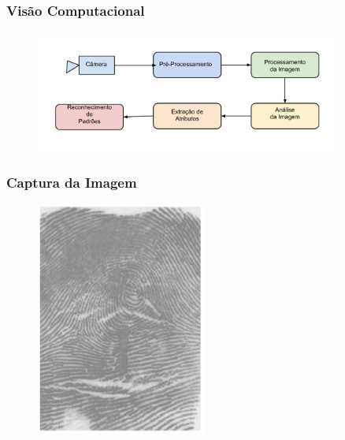 \documentclass{beamer}
\begin{document}

\begin{frame}
\frametitle{Visão Computacional}

	\begin{figure}[!h]
		\begin{center}
			\includegraphics[width=0.9\textwidth]{Figures/ProcessosVC}
		\end{center}
		
	\end{figure}
	
\end{frame}



\begin{frame}
\frametitle{Captura da Imagem}

	\begin{figure}[!h]
		\begin{center}
			\includegraphics[width=0.5\textwidth]{Figures/digital}
		\end{center}
		
	\end{figure}
	
\end{frame}
\end{document}
